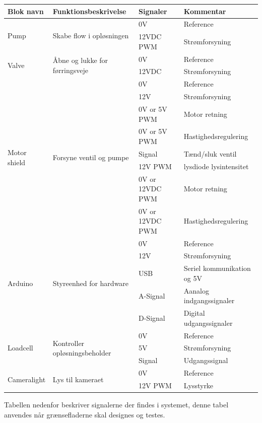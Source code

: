 \begin{center}
		\begin{longtable}{ | m{2cm} | m{4.9cm}| m{3.45cm}| m{4.15cm}| } 
			\hline
			\textbf{Blok navn} &\textbf{Funktionsbeskrivelse} &\textbf{Signaler} &\textbf{Kommentar}\\ 
			\hline
			\multirow{2}{*}{Pump} & \multirow{2}{*}{Skabe flow i opløsningen} & 0V & Reference \\ 
& & 12VDC PWM & Strømforsyning \\	
			\hline	
			\multirow{2}{*}{Valve} & \multirow{2}{*}{Åbne og lukke for førringsveje} & 0V & Reference \\ 
& & 12VDC & Strømforsyning \\	
			\hline	
		\multirow{8}{*}{Motor shield} & \multirow{8}{*}{Forsyne ventil og pumpe} & 0V & Reference \\ 
& & 12V & Strømforsyning \\	
& & 0V or 5V PWM & Motor retning \\	
& & 0V or 5V PWM & Hastighedsregulering \\
& & Signal & Tænd/sluk ventil \\
& & 12V PWM & lysdiode lysintensitet \\
& & 0V or 12VDC PWM & Motor retning \\	
& & 0V or 12VDC PWM & Hastighedsregulering \\
			\hline	
			\multirow{5}{*}{Arduino} & \multirow{5}{*}{Styreenhed for hardware} & 0V & Reference \\ 
& & 12V & Strømforsyning \\	
& & USB & Seriel kommunikation og 5V \\
& & A-Signal & Aanalog indgangssignaler \\
& & D-Signal & Digital udgangssignaler \\
			\hline
			\multirow{3}{*}{Loadcell} & \multirow{3}{*}{Kontroller opløsningsbeholder} & 0V & Reference \\ 
& & 5V & Strømforsyning \\	
& & Signal & Udgangssignal \\	
			\hline
			\multirow{2}{*}{Cameralight} & \multirow{2}{*}{Lys til kameraet} & 0V & Reference \\ 
& & 12V PWM & Lysstyrke \\	
			\hline
		\end{longtable}
	\end{center}

	
\newpage
Tabellen nedenfor beskriver signalerne der findes i systemet, denne tabel anvendes når grænsefladerne skal designes og testes.

